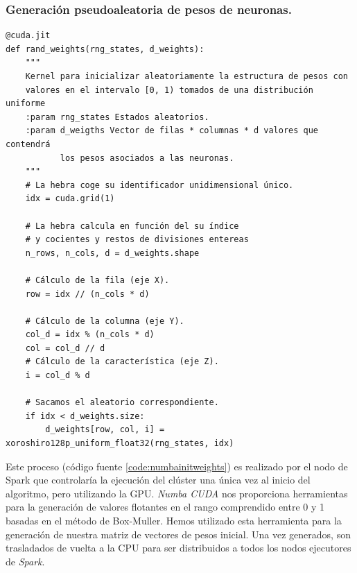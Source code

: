 \subsubsection{Generación pseudoaleatoria de pesos de neuronas.}
\begin{code}
\begin{verbatim}
@cuda.jit
def rand_weights(rng_states, d_weights):
    """
    Kernel para inicializar aleatoriamente la estructura de pesos con 
    valores en el intervalo [0, 1) tomados de una distribución uniforme
    :param rng_states Estados aleatorios.
    :param d_weigths Vector de filas * columnas * d valores que contendrá 
           los pesos asociados a las neuronas.
    """
    # La hebra coge su identificador unidimensional único.
    idx = cuda.grid(1)

    # La hebra calcula en función del su índice 
    # y cocientes y restos de divisiones entereas
    n_rows, n_cols, d = d_weights.shape

    # Cálculo de la fila (eje X).
    row = idx // (n_cols * d)

    # Cálculo de la columna (eje Y).
    col_d = idx % (n_cols * d)
    col = col_d // d
    # Cálculo de la característica (eje Z).
    i = col_d % d
    
    # Sacamos el aleatorio correspondiente.
    if idx < d_weights.size:
        d_weights[row, col, i] = xoroshiro128p_uniform_float32(rng_states, idx)

\end{verbatim}
\label{code:numbainitweights}
\end{code}

Este proceso (código fuente \ref{code:numbainitweights}) es realizado por el nodo de Spark que controlaría la ejecución del clúster una única vez al inicio del algoritmo, pero utilizando la GPU. \textit{Numba CUDA} nos proporciona herramientas para la generación de valores flotantes en el rango comprendido entre 0 y 1 basadas en el método de Box-Muller. Hemos utilizado esta herramienta para la generación de nuestra matriz de vectores de pesos inicial. Una vez generados, son trasladados de vuelta a la CPU para ser distribuidos a todos los nodos ejecutores de \textit{Spark}. \\

